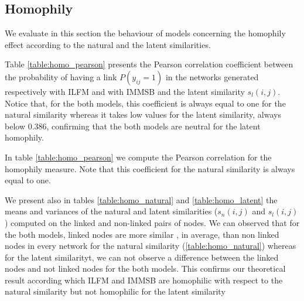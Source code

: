 \documentclass[a4paper, 12pt]{article}
\begin{document}
%

\subsection{Homophily}

We evaluate in this section the behaviour of models concerning the homophily effect according to  the natural and the latent similarities.

Table \ref{table:homo_pearson} presents the Pearson correlation coefficient between the probability of having a link $P(y_{ij}=1)$ in the networks generated respectively with ILFM and with IMMSB  and the latent similarity $s_l(i,j)$. Notice that, for the both models, this coefficient  is always equal to one for the natural similarity whereas it takes low values for the latent similarity, always below 0.386, confirming that the both models are neutral for the latent homophily.


In table \ref{table:homo_pearson} we compute the Pearson correlation for the homophily measure. Note that this coefficient for the natural similarity is always equal to one.

We present also in tables \ref{table:homo_natural} and \ref{table:homo_latent} the means and variances of the natural and latent similarities ($s_n(i,j)$ and $s_l(i,j)$) computed on the linked and non-linked pairs of nodes. We can observed that for the both models,  linked nodes are more similar , in average, than non linked nodes in every network for the natural similarity (\ref{table:homo_natural})  whereas for the latent similarityt, we can not observe a  difference between the linked nodes and not linked nodes for the both models. This confirms our theoretical result according which ILFM and IMMSB are homophilic with respect to the natural similarity but not homophilic for the latent similarity
\end{document}
